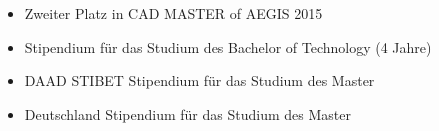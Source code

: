 \begin{itemize}
	\item Zweiter Platz in CAD MASTER of AEGIS 2015
	\item Stipendium für das Studium des Bachelor of Technology (4 Jahre)
	\item DAAD STIBET Stipendium für das Studium des Master
	\item Deutschland Stipendium für das Studium des Master
\end{itemize}
